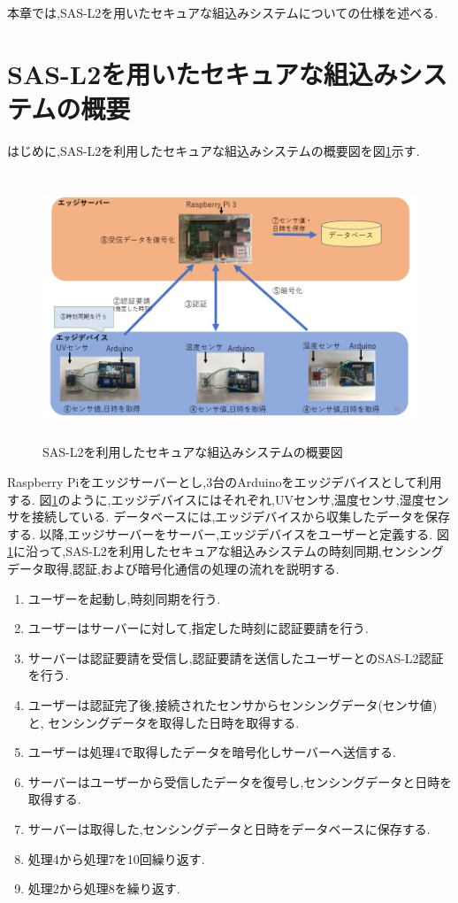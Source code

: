 
本章では,SAS-L2を用いたセキュアな組込みシステムについての仕様を述べる.

\section{SAS-L2を用いたセキュアな組込みシステムの概要}
はじめに,SAS-L2を利用したセキュアな組込みシステムの概要図を図\ref{fig:gaiyo}示す.

\begin{figure}[H]
\begin{center}
	\includegraphics[height=80mm]{gaiyo.png}
	\caption{SAS-L2を利用したセキュアな組込みシステムの概要図}
\label{fig:gaiyo}
\end{center}
\end{figure}

Raspberry Piをエッジサーバーとし,3台のArduinoをエッジデバイスとして利用する.
図\ref{fig:gaiyo}のように,エッジデバイスにはそれぞれ,UVセンサ,温度センサ,湿度センサを接続している.
データベースには,エッジデバイスから収集したデータを保存する.
以降,エッジサーバーをサーバー,エッジデバイスをユーザーと定義する.
図\ref{fig:gaiyo}に沿って,SAS-L2を利用したセキュアな組込みシステムの時刻同期,センシングデータ取得,認証,および暗号化通信の処理の流れを説明する.

\begin{enumerate}
	\item ユーザーを起動し,時刻同期を行う.
	\item ユーザーはサーバーに対して,指定した時刻に認証要請を行う.
	\item サーバーは認証要請を受信し,認証要請を送信したユーザーとのSAS-L2認証を行う.
	\item ユーザーは認証完了後,接続されたセンサからセンシングデータ(センサ値)と,
    センシングデータを取得した日時を取得する.
	\item ユーザーは処理4で取得したデータを暗号化しサーバーへ送信する.
	\item サーバーはユーザーから受信したデータを復号し,センシングデータと日時を取得する.
    \item サーバーは取得した,センシングデータと日時をデータベースに保存する.
    \item 処理4から処理7を10回繰り返す.
    \item 処理2から処理8を繰り返す.
\end{enumerate} 

